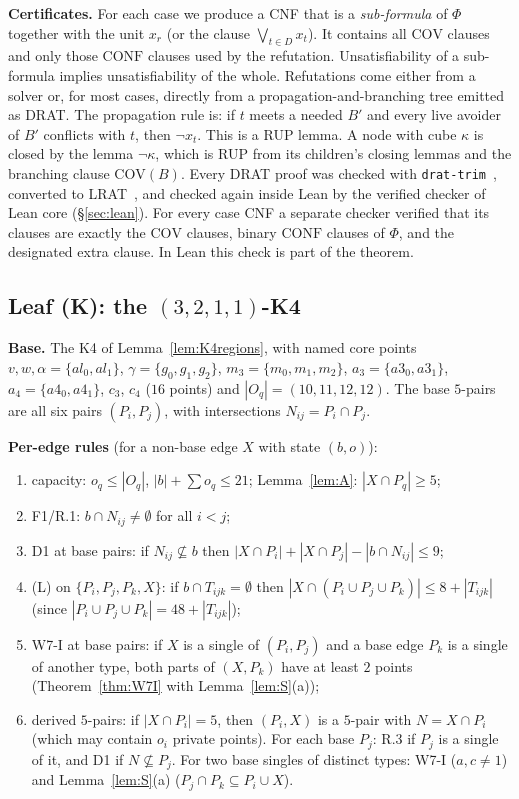 \documentclass[11pt]{amsart}
\theoremstyle{definition}
\newcommand{\Cov}{\mathrm{COV}}
\newcommand{\Conf}{\mathrm{CONF}}
\begin{document}
\textbf{Certificates.} For each case we produce a CNF that is a \emph{sub-formula} of $\Phi$ together with the unit $x_r$ (or the clause $\bigvee_{t\in D}x_t$). It contains all $\Cov$ clauses and only those $\Conf$ clauses used by the refutation. Unsatisfiability of a sub-formula implies unsatisfiability of the whole. Refutations come either from a solver or, for most cases, directly from a propagation-and-branching tree emitted as DRAT. The propagation rule is: if $t$ meets a needed $B'$ and every live avoider of $B'$ conflicts with $t$, then $\neg x_t$. This is a RUP lemma. A node with cube $\kappa$ is closed by the lemma $\neg\kappa$, which is RUP from its children's closing lemmas and the branching clause $\Cov(B)$. Every DRAT proof was checked with \texttt{drat-trim}~\cite{drat-trim}, converted to LRAT~\cite{lrat}, and checked again inside Lean by the verified checker of Lean core (\S\ref{sec:lean}). For every case CNF a separate checker verified that its clauses are exactly the $\Cov$ clauses, binary $\Conf$ clauses of $\Phi$, and the designated extra clause. In Lean this check is part of the theorem.

\subsection{\texorpdfstring{Leaf (K): the $(3,2,1,1)$-K4}{Leaf (K): the (3,2,1,1)-K4}}\label{sec:G14}
\textbf{Base.} The K4 of Lemma~\ref{lem:K4regions}, with named core points $v,w,\alpha=\{al_0,al_1\}$, $\gamma=\{g_0,g_1,g_2\}$, $m_3=\{m_0,m_1,m_2\}$, $a_3=\{a3_0,a3_1\}$, $a_4=\{a4_0,a4_1\}$, $c_3$, $c_4$ ($16$ points) and $|O_q|=(10,11,12,12)$. The base $5$-pairs are all six pairs $(P_i,P_j)$, with intersections $N_{ij}=P_i\cap P_j$.

\textbf{Per-edge rules} (for a non-base edge $X$ with state $(b,o)$):
\begin{enumerate}
\item capacity: $o_q\le|O_q|$, $|b|+\sum o_q\le 21$; Lemma~\ref{lem:A}: $|X\cap P_q|\ge5$;
\item F1/R.1: $b\cap N_{ij}\ne\emptyset$ for all $i<j$;
\item D1 at base pairs: if $N_{ij}\not\subseteq b$ then $|X\cap P_i|+|X\cap P_j|-|b\cap N_{ij}|\le 9$;
\item (L) on $\{P_i,P_j,P_k,X\}$: if $b\cap T_{ijk}=\emptyset$ then $|X\cap(P_i\cup P_j\cup P_k)|\le 8+|T_{ijk}|$ (since $|P_i\cup P_j\cup P_k|=48+|T_{ijk}|$);
\item W7-I at base pairs: if $X$ is a single of $(P_i,P_j)$ and a base edge $P_k$ is a single of another type, both parts of $(X,P_k)$ have at least $2$ points (Theorem~\ref{thm:W7I} with Lemma~\ref{lem:S}(a));
\item derived $5$-pairs: if $|X\cap P_i|=5$, then $(P_i,X)$ is a $5$-pair with $N=X\cap P_i$ (which may contain $o_i$ private points). For each base $P_j$: R.3 if $P_j$ is a single of it, and D1 if $N\not\subseteq P_j$. For two base singles of distinct types: W7-I ($a,c\ne1$) and Lemma~\ref{lem:S}(a) ($P_j\cap P_k\subseteq P_i\cup X$).
\end{enumerate}
\end{document}
